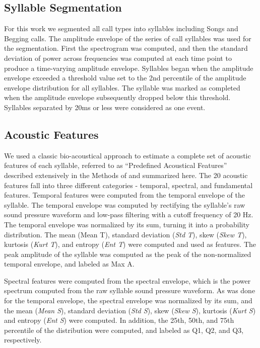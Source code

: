 \subsection{Syllable Segmentation}

For this work we segmented all call types into syllables including Songs and Begging calls. The amplitude envelope of the series of call syllables was used for the segmentation. First the spectrogram was computed, and then the standard deviation of power across frequencies was computed at each time point to produce a time-varying amplitude envelope. Syllables began when the amplitude envelope exceeded a threshold value set to the 2nd percentile of the amplitude envelope distribution for all syllables. The syllable was marked as completed when the amplitude envelope subsequently dropped below this threshold. Syllables separated by 20ms or less were considered as one event.


\subsection{Acoustic Features}

    We used a classic bio-acoustical approach to estimate a complete set of acoustic features of each syllable, referred to as “Predefined Acoustical Features” described extensively in the Methods of \cite{Elie2015b} and summarized here. The 20 acoustic features fall into three different categories - temporal, spectral, and fundamental features.
    Temporal features were computed from the temporal envelope of the syllable. The temporal envelope was computed by rectifying the syllable’s raw sound pressure waveform and low-pass filtering with a cutoff frequency of 20 Hz. The temporal envelope was normalized by its sum, turning it into a probability distribution. The mean (Mean T), standard deviation ({\em Std T}), skew ({\em Skew T}), kurtosis ({\em Kurt T}), and entropy ({\em Ent T}) were computed and used as features. The peak amplitude of the syllable was computed as the peak of the non-normalized temporal envelope, and labeled as Max A.

Spectral features were computed from the spectral envelope, which is the power spectrum computed from the raw syllable sound pressure waveform. As was done for the temporal envelope, the spectral envelope was normalized by its sum, and the mean ({\em Mean S}), standard deviation ({\em Std S}), skew ({\em Skew S}), kurtosis ({\em Kurt S}) and entropy ({\em Ent S}) were computed. In addition, the 25th, 50th, and 75th percentile of the distribution were computed, and labeled as Q1, Q2, and Q3, respectively.

